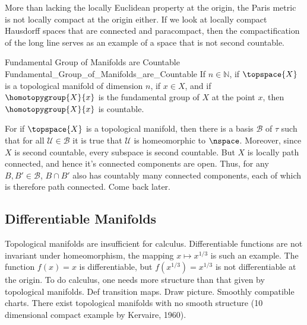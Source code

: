\documentclass{article}                                                        %
\begin{document}
            \begin{example}
                More than lacking the locally Euclidean property at the origin,
                the Paris metric is not locally compact at the origin either.
                If we look at locally compact Hausdorff spaces that are
                connected and paracompact, then the compactification of the long
                line serves as an example of a space that is not second
                countable.
            \end{example}
            \begin{ftheorem}{Fundamental Group of Manifolds are Countable}
                            {Fundamental_Group_of_Manifolds_are_Countable}
                If $n\in\mathbb{N}$, if $\topspace{X}$ is a topological
                manifold of dimension $n$, if $x\in{X}$, and if
                $\homotopygroup{X}{x}$ is the fundamental group of $X$ at the
                point $x$, then $\homotopygroup{X}{x}$ is countable.
            \end{ftheorem}
            \begin{bproof}
                For if $\topspace{X}$ is a topological manifold, then there is a
                basis $\mathcal{B}$ of $\tau$ such that for all
                $\mathcal{U}\in\mathcal{B}$ it is true that $\mathcal{U}$ is
                homeomorphic to $\nspace$. Moreover, since $X$ is second
                countable, every subspace is second countable. But $X$ is
                locally path connected, and hence it's connected components are
                open. Thus, for any $B,B'\in\mathcal{B}$, $B\cap{B}'$ also has
                countably many connected components, each of which is therefore
                path connected. Come back later.
            \end{bproof}
        \subsection{Differentiable Manifolds}
            Topological manifolds are insufficient for calculus. Differentiable
            functions are not invariant under homeomorphism, the mapping
            $x\mapsto{x}^{1/3}$ is such an example. The function $f(x)=x$ is
            differentiable, but $f(x^{1/3})=x^{1/3}$ is not differentiable at
            the origin. To do calculus, one needs more structure than that given
            by topological manifolds. Def transition maps. Draw picture.
            Smoothly compatible charts. There exist topological manifolds with
            no smooth structure (10 dimensional compact example by Kervaire,
            1960).
\end{document}
